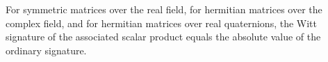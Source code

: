 For symmetric matrices over the real field, for hermitian matrices over the complex field, and for hermitian matrices over real quaternions, the Witt signature of the associated scalar product equals the absolute value of the ordinary signature.
